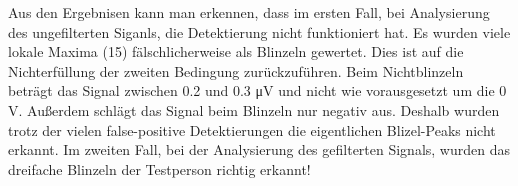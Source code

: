 \documentclass[11pt]{article}
\begin{document}
    Aus den Ergebnisen kann man erkennen, dass im ersten Fall, bei
Analysierung des ungefilterten Siganls, die Detektierung nicht
funktioniert hat. Es wurden viele lokale Maxima (15) fälschlicherweise
als Blinzeln gewertet. Dies ist auf die Nichterfüllung der zweiten
Bedingung zurückzuführen. Beim Nichtblinzeln beträgt das Signal zwischen
0.2 und 0.3 μV und nicht wie vorausgesetzt um die 0 V. Außerdem schlägt
das Signal beim Blinzeln nur negativ aus. Deshalb wurden trotz der
vielen false-positive Detektierungen die eigentlichen Blizel-Peaks nicht
erkannt. Im zweiten Fall, bei der Analysierung des gefilterten Signals,
wurden das dreifache Blinzeln der Testperson richtig erkannt!


    
    
    
    
\end{document}
